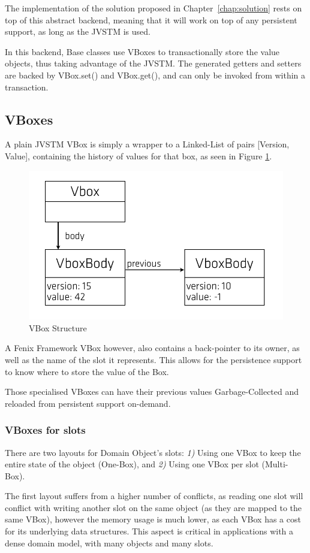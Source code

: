 The implementation of the solution proposed in
Chapter~\ref{chap:solution} rests on top of this abstract backend,
meaning that it will work on top of any persistent support, as long as
the JVSTM is used.

In this backend, Base classes use VBoxes to transactionally store the
value objects, thus taking advantage of the JVSTM. The generated
getters and setters are backed by VBox.set() and VBox.get(), and can
only be invoked from within a transaction.

\subsection{VBoxes}

A plain JVSTM VBox is simply a wrapper to a Linked-List of pairs
[Version, Value], containing the history of values for that
box, as seen in Figure \ref{fig:vbox}.

\begin{figure}
\centering
\includegraphics[width=0.5\linewidth]{vbox-list}
\caption{VBox Structure}
\label{fig:vbox}
\end{figure}

A Fenix Framework VBox however, also contains a back-pointer to its
owner, as well as the name of the slot it represents. This allows for
the persistence support to know where to store the value of the Box.

Those specialised VBoxes can have their previous values
Garbage-Collected and reloaded from persistent support on-demand.

\subsubsection{VBoxes for slots}

There are two layouts for Domain Object's slots: {\it 1)} Using one VBox to
keep the entire state of the object (One-Box), and {\it 2)} Using one VBox
per slot (Multi-Box).

The first layout suffers from a higher number of conflicts, as reading
one slot will conflict with writing another slot on the same object
(as they are mapped to the same VBox), however the memory usage is
much lower, as each VBox has a cost for its underlying data
structures. This aspect is critical in applications with a dense
domain model, with many objects and many slots.

